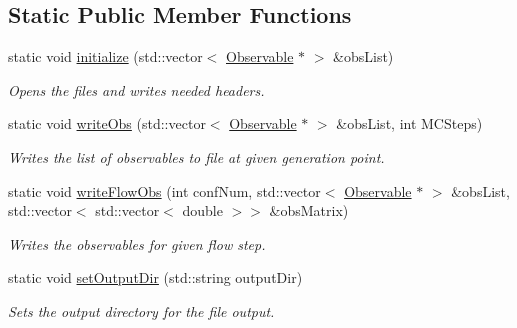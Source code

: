 \subsection*{Static Public Member Functions}
\begin{DoxyCompactItemize}
\item 
static void \hyperlink{classLatticeIO_1_1OutputObs_a472ae3b7d294a80a89642b6464ee8f7d}{initialize} (std\+::vector$<$ \hyperlink{classObservable}{Observable} $\ast$ $>$ \&obs\+List)\hypertarget{classLatticeIO_1_1OutputObs_a472ae3b7d294a80a89642b6464ee8f7d}{}\label{classLatticeIO_1_1OutputObs_a472ae3b7d294a80a89642b6464ee8f7d}

\begin{DoxyCompactList}\small\item\em Opens the files and writes needed headers. \end{DoxyCompactList}\item 
static void \hyperlink{classLatticeIO_1_1OutputObs_a914832abc00b24dc989a3f0b066ff026}{write\+Obs} (std\+::vector$<$ \hyperlink{classObservable}{Observable} $\ast$ $>$ \&obs\+List, int M\+C\+Steps)\hypertarget{classLatticeIO_1_1OutputObs_a914832abc00b24dc989a3f0b066ff026}{}\label{classLatticeIO_1_1OutputObs_a914832abc00b24dc989a3f0b066ff026}

\begin{DoxyCompactList}\small\item\em Writes the list of observables to file at given generation point. \end{DoxyCompactList}\item 
static void \hyperlink{classLatticeIO_1_1OutputObs_a29d0eca3206d892a926ecf051c0ecfc3}{write\+Flow\+Obs} (int conf\+Num, std\+::vector$<$ \hyperlink{classObservable}{Observable} $\ast$ $>$ \&obs\+List, std\+::vector$<$ std\+::vector$<$ double $>$$>$ \&obs\+Matrix)\hypertarget{classLatticeIO_1_1OutputObs_a29d0eca3206d892a926ecf051c0ecfc3}{}\label{classLatticeIO_1_1OutputObs_a29d0eca3206d892a926ecf051c0ecfc3}

\begin{DoxyCompactList}\small\item\em Writes the observables for given flow step. \end{DoxyCompactList}\item 
static void \hyperlink{classLatticeIO_1_1OutputObs_a3adffec5a9f218182a6d45cce7735362}{set\+Output\+Dir} (std\+::string output\+Dir)\hypertarget{classLatticeIO_1_1OutputObs_a3adffec5a9f218182a6d45cce7735362}{}\label{classLatticeIO_1_1OutputObs_a3adffec5a9f218182a6d45cce7735362}

\begin{DoxyCompactList}\small\item\em Sets the output directory for the file output. \end{DoxyCompactList}\end{DoxyCompactItemize}
